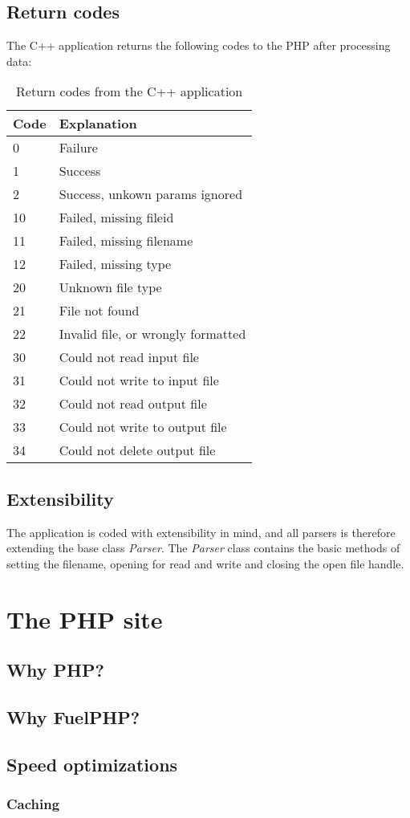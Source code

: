 \subsection{Return codes}
The C++ application returns the following codes to the PHP after processing data:
\begin{table}[htbp]
\centering
\begin{tabular}{|l|l|}
\hline
\textbf{Code} & \textbf{Explanation}\\
\hline
0 & Failure\\
\hline
1 & Success\\
\hline
2 & Success, unkown params ignored\\
\hline
10 & Failed, missing fileid\\
\hline
11 & Failed, missing filename\\
\hline
12 & Failed, missing type\\
\hline
20 & Unknown file type\\
\hline
21 & File not found\\
\hline
22 & Invalid file, or wrongly formatted\\
\hline
30 & Could not read input file\\
\hline
31 & Could not write to input file\\
\hline
32 & Could not read output file\\
\hline
33 & Could not write to output file\\
\hline
34 & Could not delete output file\\
\hline
\end{tabular}
\label{tab:cppReturnCodes}
\caption{Return codes from the C++ application}
\end{table}

\subsection{Extensibility}
The application is coded with extensibility in mind, and all parsers is therefore extending the base class \emph{Parser}.
The \emph{Parser} class contains the basic methods of setting the filename, opening for read and write and closing the open file handle.

\section{The PHP site}
\subsection{Why PHP?}

\subsection{Why FuelPHP?}

\subsection{Speed optimizations}
\subsubsection{Caching}